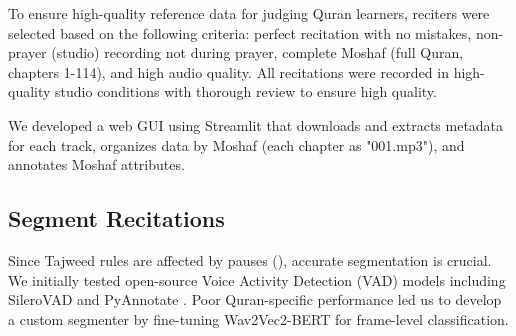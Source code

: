 To ensure high-quality reference data for judging Quran learners, reciters were selected based on the following criteria: perfect recitation with no mistakes, non-prayer (studio) recording not during prayer, complete Moshaf (full Quran, chapters 1-114), and high audio quality. All recitations were recorded in high-quality studio conditions with thorough review to ensure high quality.




We developed a web GUI using Streamlit that downloads and extracts metadata for each track, organizes data by Moshaf (each chapter as "001.mp3"), and annotates Moshaf attributes.

\subsection{Segment Recitations}
Since Tajweed rules are affected by pauses (), accurate segmentation is crucial. We initially tested open-source Voice Activity Detection (VAD) models including SileroVAD \cite{SileroVAD} and PyAnnotate \cite{Plaquet23}. Poor Quran-specific performance led us to develop a custom segmenter by fine-tuning Wav2Vec2-BERT \cite{barrault2023seamless} for frame-level classification. %

